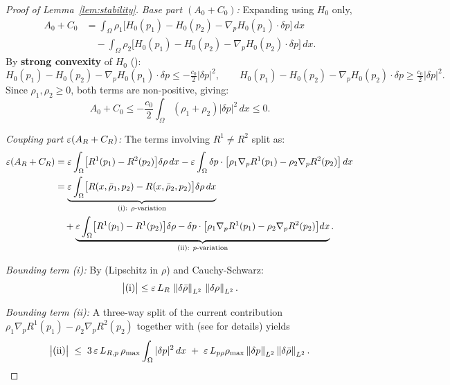 \begin{proof}[Proof of Lemma~\ref{lem:stability}]
\textit{Base part $(A_0 + C_0)$:} Expanding using $H_0$ only,
\begin{align*}
  A_0 + C_0
  &= \int_\Omega \rho_1\bigl[H_0(p_1) - H_0(p_2) - \nabla_p H_0(p_1)\cdot\delta p\bigr]\, dx\\
  &\quad - \int_\Omega \rho_2\bigl[H_0(p_1) - H_0(p_2) - \nabla_p H_0(p_2)\cdot\delta p\bigr]\, dx.
\end{align*}
By \textbf{strong convexity} of $H_0$ ():
\[
  H_0(p_1) - H_0(p_2) - \nabla_p H_0(p_1)\cdot\delta p \leq -\tfrac{c_0}{2}|\delta p|^2,
  \qquad
  H_0(p_1) - H_0(p_2) - \nabla_p H_0(p_2)\cdot\delta p \geq \tfrac{c_0}{2}|\delta p|^2.
\]
Since $\rho_1,\rho_2 \geq 0$, both terms are non-positive, giving:
\begin{equation}\label{eq:convex_bound}
  A_0 + C_0 \leq -\frac{c_0}{2}\int_\Omega (\rho_1+\rho_2)|\delta p|^2\, dx \leq 0.
\end{equation}

\textit{Coupling part $\varepsilon(A_R + C_R)$:}
The terms involving $R^1 \neq R^2$ split as:
\begin{align}
  \varepsilon(A_R + C_R)
  &= \varepsilon\int_\Omega \bigl[R^1(p_1) - R^2(p_2)\bigr]\delta\rho\, dx
   - \varepsilon\int_\Omega \delta p\cdot\bigl[\rho_1\nabla_p R^1(p_1) - \rho_2\nabla_p R^2(p_2)\bigr]\, dx
  \notag\\
  &= \underbrace{\varepsilon\int_\Omega \bigl[R(x,\bar\rho_1,p_2)
        - R(x,\bar\rho_2,p_2)\bigr]\delta\rho\, dx}_{\text{(i): }\rho\text{-variation}}
  \notag\\
  &\quad + \underbrace{\varepsilon\int_\Omega \bigl[R^1(p_1)-R^1(p_2)\bigr]\delta\rho
        - \delta p\cdot\bigl[\rho_1\nabla_p R^1(p_1) - \rho_2\nabla_p R^2(p_2)\bigr]dx}_{\text{(ii): }p\text{-variation}}.
  \label{eq:coupling_split}
\end{align}

\textit{Bounding term (i):}
By  (Lipschitz in $\rho$) and Cauchy-Schwarz:
\begin{equation}\label{eq:rho_bound}
  \bigl|\text{(i)}\bigr|
  \leq \varepsilon\, L_R\,\left\lVert \delta\bar\rho \right\rVert_{L^2}\,\left\lVert \delta\rho \right\rVert_{L^2}.
\end{equation}

\textit{Bounding term (ii):}
A three-way split of the current contribution
$\rho_1\nabla_pR^1(p_1) - \rho_2\nabla_pR^2(p_2)$ together with
 (see  for details) yields
\begin{equation}\label{eq:p_bound}
  \bigl|\text{(ii)}\bigr|
  \;\leq\; 3\,\varepsilon\, L_{R,p}\,\rho_{\max}\int_\Omega |\delta p|^2\, dx
  \;+\; \varepsilon\,L_{p\rho}\rho_{\max}
  \left\lVert \delta p \right\rVert_{L^2}\left\lVert \delta\bar\rho \right\rVert_{L^2}.
\end{equation}


\end{proof}
